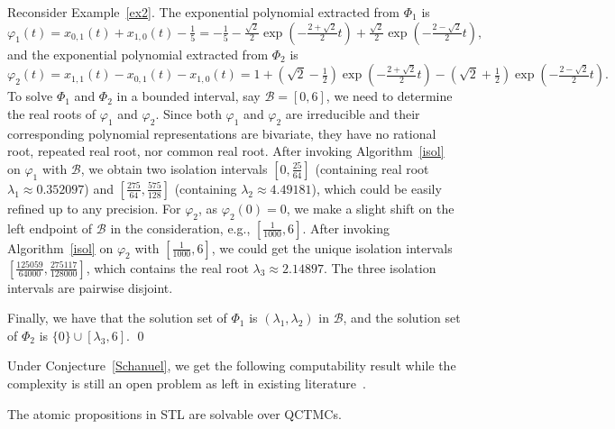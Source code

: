 \documentclass[a4paper,UKenglish,cleveref,autoref,thm-restate,authorcolumns]{lipics-v2019}
\begin{document}
\begin{example}\label{ex3}
Reconsider Example~\ref{ex2}. 
The exponential polynomial extracted from $\Phi_1$ is
\[
	\varphi_1(t) = x_{0,1}(t) + x_{1,0}(t) - \tfrac{1}{5}
	= -\tfrac{1}{5}	- \tfrac{\sqrt{2}}{2}\exp(-\tfrac{2+\sqrt{2}}{2}t)
	+ \tfrac{\sqrt{2}}{2}\exp(-\tfrac{2-\sqrt{2}}{2}t),
\]
and the exponential polynomial extracted from $\Phi_2$ is
\[
	\varphi_2(t) = x_{1,1}(t) - x_{0,1}(t) - x_{1,0}(t) 
	= 1+(\sqrt{2}-\tfrac{1}{2})\exp(-\tfrac{2+\sqrt{2}}{2}t)
	- (\sqrt{2}+\tfrac{1}{2})\exp(-\tfrac{2-\sqrt{2}}{2}t).
\] 
To solve $\Phi_1$ and $\Phi_2$ in a bounded interval, say $\mathcal{B}=[0,6]$,
we need to determine the real roots of $\varphi_1$ and $\varphi_2$.
Since both $\varphi_1$ and $\varphi_2$ are irreducible
and their corresponding polynomial representations are bivariate,
they have no rational root, repeated real root, nor common real root. 
After invoking Algorithm~\ref{isol} on $\varphi_1$ with $\mathcal{B}$,
we obtain two isolation intervals $[0,\tfrac{25}{64}]$
(containing real root $\lambda_1 \approx 0.352097$)
and $[\tfrac{275}{64},\tfrac{575}{128}]$ (containing $\lambda_2 \approx 4.49181$),
which could be easily refined up to any precision.
For $\varphi_2$,
as $\varphi_2(0) = 0$, 
we make a slight shift on the left endpoint of $\mathcal{B}$ in the consideration,
e.g., $[\tfrac{1}{1000},6]$.
After invoking Algorithm~\ref{isol} on $\varphi_2$ with $[\tfrac{1}{1000},6]$,
we could get the unique isolation intervals	$[\tfrac{125059}{64000},\tfrac{275117}{128000}]$,
which contains the real root $\lambda_3 \approx 2.14897$.
The three isolation intervals are pairwise disjoint.

Finally, we have that
the solution set of $\Phi_1$ is $(\lambda_1,\lambda_2)$ in $\mathcal{B}$,
and the solution set of $\Phi_2$ is $\{0\} \cup [\lambda_3,6]$. \qed
\end{example}

Under Conjecture~\ref{Schanuel}, we get the following computability result
while the complexity is still an open problem as left in existing literature~\cite{COW16,HLX+18}.
\begin{lemma}
	The atomic propositions in STL are solvable over QCTMCs.
\end{lemma}
\end{document}
